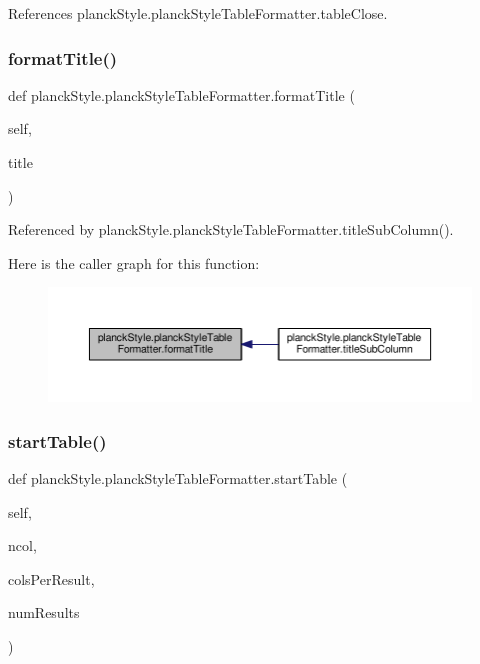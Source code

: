 References planck\+Style.\+planck\+Style\+Table\+Formatter.\+table\+Close.

\mbox{\label{classplanckStyle_1_1planckStyleTableFormatter_a0c7491ba27c75f0544c22edcf0b0f9c4}} 
\subsubsection{\texorpdfstring{format\+Title()}{formatTitle()}}
{\footnotesize\ttfamily def planck\+Style.\+planck\+Style\+Table\+Formatter.\+format\+Title (\begin{DoxyParamCaption}\item[{}]{self,  }\item[{}]{title }\end{DoxyParamCaption})}



Referenced by planck\+Style.\+planck\+Style\+Table\+Formatter.\+title\+Sub\+Column().

Here is the caller graph for this function\+:
\nopagebreak
\begin{figure}[H]
\begin{center}
\leavevmode
\includegraphics[width=350pt]{classplanckStyle_1_1planckStyleTableFormatter_a0c7491ba27c75f0544c22edcf0b0f9c4_icgraph}
\end{center}
\end{figure}
\mbox{\label{classplanckStyle_1_1planckStyleTableFormatter_abe8f6696463aec9d635db898a31b12d7}} 
\subsubsection{\texorpdfstring{start\+Table()}{startTable()}}
{\footnotesize\ttfamily def planck\+Style.\+planck\+Style\+Table\+Formatter.\+start\+Table (\begin{DoxyParamCaption}\item[{}]{self,  }\item[{}]{ncol,  }\item[{}]{cols\+Per\+Result,  }\item[{}]{num\+Results }\end{DoxyParamCaption})}



